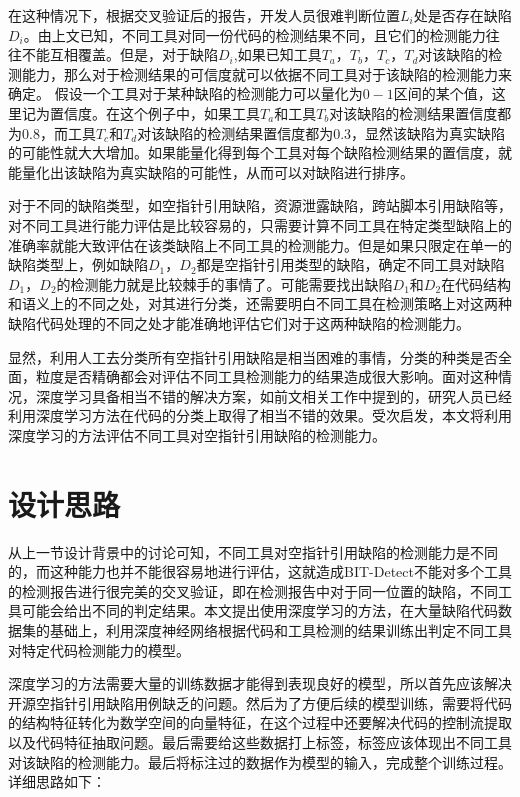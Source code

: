 在这种情况下，根据交叉验证后的报告，开发人员很难判断位置$L_i$处是否存在缺陷$D_i$。由上文已知，不同工具对同一份代码的检测结果不同，且它们的检测能力往往不能互相覆盖。但是，对于缺陷$D_i$,如果已知工具$T_a$，$T_b$，$T_c$，$T_d$对该缺陷的检测能力，那么对于检测结果的可信度就可以依据不同工具对于该缺陷的检测能力来确定。
假设一个工具对于某种缺陷的检测能力可以量化为$0-1$区间的某个值，这里记为置信度。在这个例子中，如果工具$T_a$和工具$T_b$对该缺陷的检测结果置信度都为0.8，而工具$T_c$和$T_d$对该缺陷的检测结果置信度都为0.3，显然该缺陷为真实缺陷的可能性就大大增加。如果能量化得到每个工具对每个缺陷检测结果的置信度，就能量化出该缺陷为真实缺陷的可能性，从而可以对缺陷进行排序。

对于不同的缺陷类型，如空指针引用缺陷，资源泄露缺陷，跨站脚本引用缺陷等，对不同工具进行能力评估是比较容易的，只需要计算不同工具在特定类型缺陷上的准确率就能大致评估在该类缺陷上不同工具的检测能力。但是如果只限定在单一的缺陷类型上，例如缺陷$D_1$，$D_2$都是空指针引用类型的缺陷，确定不同工具对缺陷$D_1$，$D_2$的检测能力就是比较棘手的事情了。可能需要找出缺陷$D_1$和$D_2$在代码结构和语义上的不同之处，对其进行分类，还需要明白不同工具在检测策略上对这两种缺陷代码处理的不同之处才能准确地评估它们对于这两种缺陷的检测能力。

显然，利用人工去分类所有空指针引用缺陷是相当困难的事情，分类的种类是否全面，粒度是否精确都会对评估不同工具检测能力的结果造成很大影响。面对这种情况，深度学习具备相当不错的解决方案，如前文相关工作中提到的，研究人员已经利用深度学习方法在代码的分类上取得了相当不错的效果。受次启发，本文将利用深度学习的方法评估不同工具对空指针引用缺陷的检测能力。

\section{设计思路}
从上一节设计背景中的讨论可知，不同工具对空指针引用缺陷的检测能力是不同的，而这种能力也并不能很容易地进行评估，这就造成BIT-Detect不能对多个工具的检测报告进行很完美的交叉验证，即在检测报告中对于同一位置的缺陷，不同工具可能会给出不同的判定结果。本文提出使用深度学习的方法，在大量缺陷代码数据集的基础上，利用深度神经网络根据代码和工具检测的结果训练出判定不同工具对特定代码检测能力的模型。

深度学习的方法需要大量的训练数据才能得到表现良好的模型，所以首先应该解决开源空指针引用缺陷用例缺乏的问题。然后为了方便后续的模型训练，需要将代码的结构特征转化为数学空间的向量特征，在这个过程中还要解决代码的控制流提取以及代码特征抽取问题。最后需要给这些数据打上标签，标签应该体现出不同工具对该缺陷的检测能力。最后将标注过的数据作为模型的输入，完成整个训练过程。详细思路如下：

